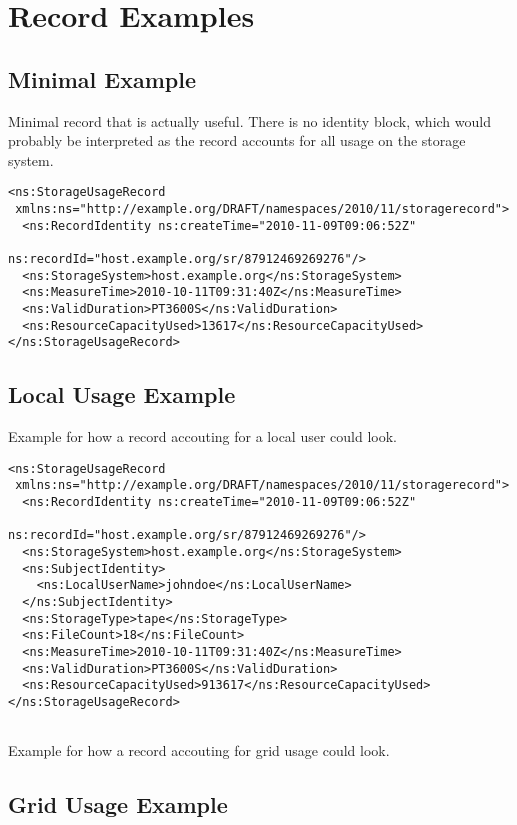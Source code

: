 
\section{Record Examples}
\label{sec:record-examples}


\subsection{Minimal Example}

Minimal record that is actually useful. There is no identity block, which would
probably be interpreted as the record accounts for all usage on the storage
system.

\begin{verbatim}
<ns:StorageUsageRecord
 xmlns:ns="http://example.org/DRAFT/namespaces/2010/11/storagerecord">
  <ns:RecordIdentity ns:createTime="2010-11-09T09:06:52Z"
                     ns:recordId="host.example.org/sr/87912469269276"/>
  <ns:StorageSystem>host.example.org</ns:StorageSystem>
  <ns:MeasureTime>2010-10-11T09:31:40Z</ns:MeasureTime>
  <ns:ValidDuration>PT3600S</ns:ValidDuration>
  <ns:ResourceCapacityUsed>13617</ns:ResourceCapacityUsed>
</ns:StorageUsageRecord>
\end{verbatim}


\subsection{Local Usage Example}

Example for how a record accouting for a local user could look.

\begin{verbatim}
<ns:StorageUsageRecord
 xmlns:ns="http://example.org/DRAFT/namespaces/2010/11/storagerecord">
  <ns:RecordIdentity ns:createTime="2010-11-09T09:06:52Z"
                     ns:recordId="host.example.org/sr/87912469269276"/>
  <ns:StorageSystem>host.example.org</ns:StorageSystem>
  <ns:SubjectIdentity>
    <ns:LocalUserName>johndoe</ns:LocalUserName>
  </ns:SubjectIdentity>
  <ns:StorageType>tape</ns:StorageType>
  <ns:FileCount>18</ns:FileCount>
  <ns:MeasureTime>2010-10-11T09:31:40Z</ns:MeasureTime>
  <ns:ValidDuration>PT3600S</ns:ValidDuration>
  <ns:ResourceCapacityUsed>913617</ns:ResourceCapacityUsed>
</ns:StorageUsageRecord>


\end{verbatim}

Example for how a record accouting for grid usage could look.

\subsection{Grid Usage Example}

